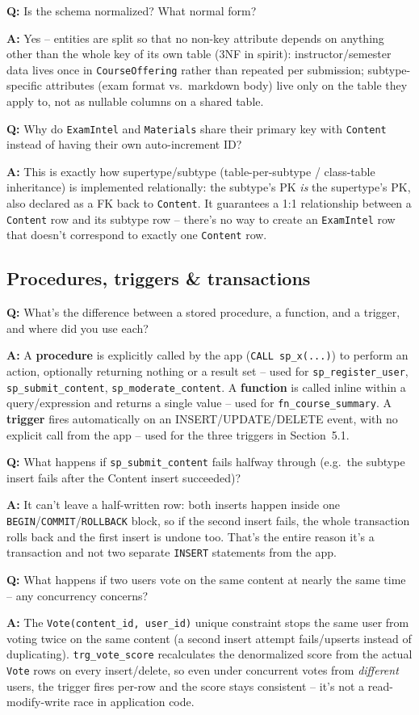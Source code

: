 \documentclass[11pt]{article}
\newcommand{\qitem}[2]{%
  \par\medskip\noindent\textbf{\color{accentc}Q:} #1\par
  \noindent\textbf{A:} #2\par
}
\begin{document}
\qitem{Is the schema normalized? What normal form?}{Yes -- entities are split so that no non-key attribute depends on anything other than the whole key of its own table (3NF in spirit): instructor/semester data lives once in \texttt{CourseOffering} rather than repeated per submission; subtype-specific attributes (exam format vs.\ markdown body) live only on the table they apply to, not as nullable columns on a shared table.}

\qitem{Why do \texttt{ExamIntel} and \texttt{Materials} share their primary key with \texttt{Content} instead of having their own auto-increment ID?}{This is exactly how supertype/subtype (table-per-subtype / class-table inheritance) is implemented relationally: the subtype's PK \emph{is} the supertype's PK, also declared as a FK back to \texttt{Content}. It guarantees a 1:1 relationship between a \texttt{Content} row and its subtype row -- there's no way to create an \texttt{ExamIntel} row that doesn't correspond to exactly one \texttt{Content} row.}

\subsection{Procedures, triggers \& transactions}

\qitem{What's the difference between a stored procedure, a function, and a trigger, and where did you use each?}{A \textbf{procedure} is explicitly called by the app (\texttt{CALL sp\_x(...)}) to perform an action, optionally returning nothing or a result set -- used for \texttt{sp\_register\_user}, \texttt{sp\_submit\_content}, \texttt{sp\_moderate\_content}. A \textbf{function} is called inline within a query/expression and returns a single value -- used for \texttt{fn\_course\_summary}. A \textbf{trigger} fires automatically on an INSERT/UPDATE/DELETE event, with no explicit call from the app -- used for the three triggers in Section~5.1.}

\qitem{What happens if \texttt{sp\_submit\_content} fails halfway through (e.g.\ the subtype insert fails after the Content insert succeeded)?}{It can't leave a half-written row: both inserts happen inside one \texttt{BEGIN}/\texttt{COMMIT}/\texttt{ROLLBACK} block, so if the second insert fails, the whole transaction rolls back and the first insert is undone too. That's the entire reason it's a transaction and not two separate \texttt{INSERT} statements from the app.}

\qitem{What happens if two users vote on the same content at nearly the same time -- any concurrency concerns?}{The \texttt{Vote(content\_id, user\_id)} unique constraint stops the same user from voting twice on the same content (a second insert attempt fails/upserts instead of duplicating). \texttt{trg\_vote\_score} recalculates the denormalized score from the actual \texttt{Vote} rows on every insert/delete, so even under concurrent votes from \emph{different} users, the trigger fires per-row and the score stays consistent -- it's not a read-modify-write race in application code.}
\end{document}
